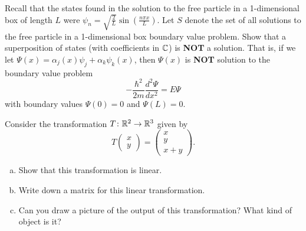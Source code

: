 \documentclass[12pt]{article} %
\begin{document}
\begin{problem}
Recall that the states found in the solution to the free particle in a 1-dimensional box of length $L$ were $\psi_n = \sqrt{\frac{2}{L}} \sin \left( \frac{n\pi x}{L}\right)$. Let $S$ denote the set of all solutions to the free particle in a 1-dimensional box boundary value problem. Show that a superposition of states (with coefficients in $\mathbb{C}$) is \textbf{NOT} a solution. That is, if we let $\Psi(x) = \alpha_{j}(x) \psi_j + \alpha_k \psi_k(x)$, then $\Psi(x)$ is \textbf{NOT} solution to the boundary value problem
\[
-\frac{\hbar^2}{2m}\frac{d^2 \Psi}{dx^2}=E\Psi
\]
with boundary values $\Psi(0)=0$ and $\Psi(L)=0$.
\end{problem}

\begin{problem}
Consider the transformation $T\colon \mathbb{R}^2 \to \mathbb{R}^3$ given by
\[
T \begin{pmatrix} x \\ y \end{pmatrix} = \begin{pmatrix} x \\ y \\ x+y \end{pmatrix}.
\]
\begin{enumerate}[(a)]
    \item Show that this transformation is linear.
    \item Write down a matrix for this linear transformation.
    \item Can you draw a picture of the output of this transformation? What kind of object is it?
\end{enumerate}
\end{problem}
\end{document}
